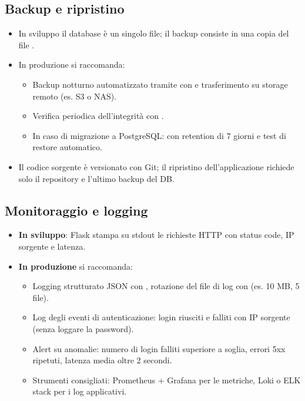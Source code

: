 \subsection{Backup e ripristino}
\begin{itemize}
    \item In sviluppo il database è un singolo file; il backup consiste
    in una copia del file .
    \item In produzione si raccomanda:
    \begin{itemize}
        \item Backup notturno automatizzato tramite  con
        e trasferimento su storage remoto (es. S3 o NAS).
        \item Verifica periodica dell'integrità con
        .
        \item In caso di migrazione a PostgreSQL:  con
        retention di 7 giorni e test di restore automatico.
    \end{itemize}
    \item Il codice sorgente è versionato con Git; il ripristino
    dell'applicazione richiede solo il repository e l'ultimo backup del DB.
\end{itemize}

\subsection{Monitoraggio e logging}
\begin{itemize}
    \item \textbf{In sviluppo}: Flask stampa su stdout le richieste
    HTTP con status code, IP sorgente e latenza.
    \item \textbf{In produzione} si raccomanda:
    \begin{itemize}
        \item Logging strutturato JSON con ,
        rotazione del file di log con 
        (es. 10 MB, 5 file).
        \item Log degli eventi di autenticazione: login riusciti e
        falliti con IP sorgente (senza loggare la password).
        \item Alert su anomalie: numero di login falliti superiore a
        soglia, errori 5xx ripetuti, latenza media oltre 2 secondi.
        \item Strumenti consigliati: Prometheus + Grafana per le metriche,
        Loki o ELK stack per i log applicativi.
    \end{itemize}
\end{itemize}

